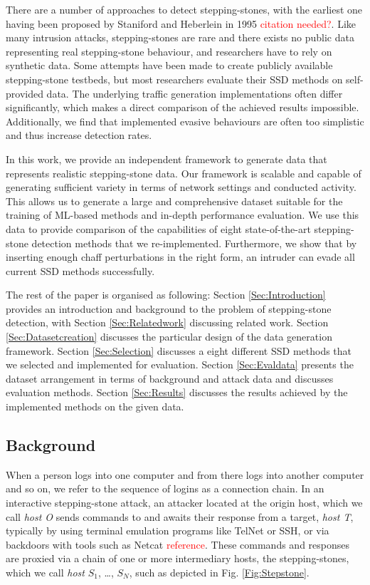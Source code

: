 \documentclass[runningheads]{llncs}\usepackage[]{graphicx}\usepackage[]{color}
\begin{document}
There are a number of approaches to detect stepping-stones, with the earliest one having been proposed by Staniford and Heberlein in 1995 \textcolor{red}{citation needed?}. Like many intrusion attacks, stepping-stones are rare and there exists no public data representing real stepping-stone behaviour, and researchers have to rely on synthetic data. Some attempts have been made to create publicly available stepping-stone testbeds, but most researchers evaluate their SSD methods on self-provided data. The underlying traffic generation implementations often differ significantly, which makes a direct comparison of the achieved results impossible. Additionally, we find that implemented evasive behaviours are often too simplistic and thus increase detection rates. 

In this work, we provide an independent framework to generate data that represents realistic stepping-stone data. Our framework is scalable and capable of generating sufficient variety in terms of network settings and conducted activity. This allows us to generate a large and comprehensive dataset suitable for the training of ML-based methods and in-depth performance evaluation. We use this data to provide comparison of the capabilities of eight state-of-the-art stepping-stone detection methods that we re-implemented. Furthermore, we show that by inserting enough chaff perturbations in the right form, an intruder can evade all current SSD methods successfully.

The rest of the paper is organised as following: Section \ref{Sec:Introduction} provides an introduction and background to the problem of stepping-stone detection, with Section \ref{Sec:Relatedwork} discussing related work. Section \ref{Sec:Datasetcreation} discusses the particular design of the data generation framework. Section \ref{Sec:Selection} discusses a eight different SSD methods that we selected and implemented for evaluation. Section \ref{Sec:Evaldata} presents the dataset arrangement in terms of background and attack data and discusses evaluation methods. Section \ref{Sec:Results} discusses the results achieved by the implemented methods on the given data. 

\subsection{Background}

When a person logs into one computer and from there logs into another computer and so on, we refer to the sequence of logins as a connection chain. In an interactive stepping-stone attack, an attacker located at the origin host, which we call \textit{host O} sends commands to and awaits their response from a target, \textit{host T}, typically by using terminal emulation programs like TelNet or SSH, or via backdoors with tools such as Netcat  \textcolor{red}{reference}. These commands and responses are proxied via a chain of one or more intermediary hosts, the stepping-stones, which we call \textit{host} $S_1$, \dots, $S_N$, such as depicted in Fig. \ref{Fig:Stepstone}. 
\end{document}
